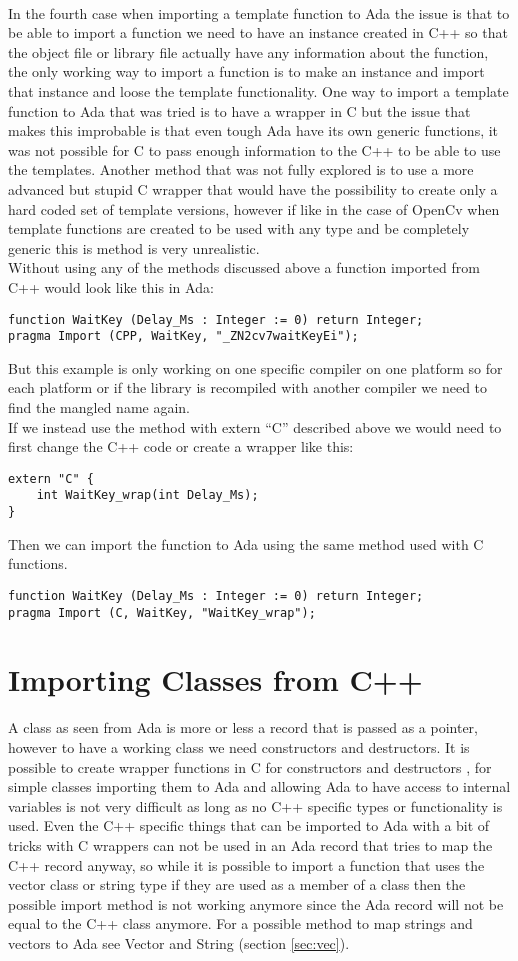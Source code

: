 \\
In the fourth case when importing a template function to Ada the issue is that to be able to import a function we need to have an instance created in C++ so that the object file or library file actually have any information about the function, the only working way to import a function is to make an instance and import that instance and loose the template functionality. One way to import a template function to Ada that was tried is to have a wrapper in C but the issue that makes this improbable is that even tough Ada have its own generic functions, it was not possible for C to pass enough information to the C++ to be able to use the templates. Another method that was not fully explored is to use a more advanced but stupid C wrapper that would have the possibility to create only a hard coded set of template versions, however if like in the case of OpenCv when template functions are created to be used with any type and be completely generic this is method is very unrealistic. 
\\
Without using any of the methods discussed above a function imported from C++ would look like this in Ada:
\begin{lstlisting}
function WaitKey (Delay_Ms : Integer := 0) return Integer;
pragma Import (CPP, WaitKey, "_ZN2cv7waitKeyEi");
\end{lstlisting}
But this example is only working on one specific compiler on one platform so for each platform or if the library is recompiled with another compiler we need to find the mangled name again.
\\
If we instead use the method with extern “C” described above we would need to first change the C++ code or create a wrapper like this:
\begin{lstlisting}
extern "C" {
	int WaitKey_wrap(int Delay_Ms);
}
\end{lstlisting}
Then we can import the function to Ada using the same method used with C functions.
\begin{lstlisting}
function WaitKey (Delay_Ms : Integer := 0) return Integer;
pragma Import (C, WaitKey, "WaitKey_wrap");
\end{lstlisting}
\section{Importing Classes from C++}
A class as seen from Ada is more or less a record that is passed as a pointer, however to have a working class we need constructors and destructors. It is possible to create wrapper functions in C for constructors and destructors \cite{gccclasses}, for simple classes importing them to Ada and allowing Ada to have access to internal variables is not very difficult as long as no C++ specific types or functionality is used. Even the C++ specific things that can be imported to Ada with a bit of tricks with C wrappers can not be used in an Ada record that tries to map the C++ record anyway, so while it is possible to import a function that uses the vector class or string type if they are used as a member of a class then the possible import method is not working anymore since the Ada record will not be equal to the C++ class anymore. For a possible method to map strings and vectors to Ada see Vector and String (section \ref{sec:vec}).
